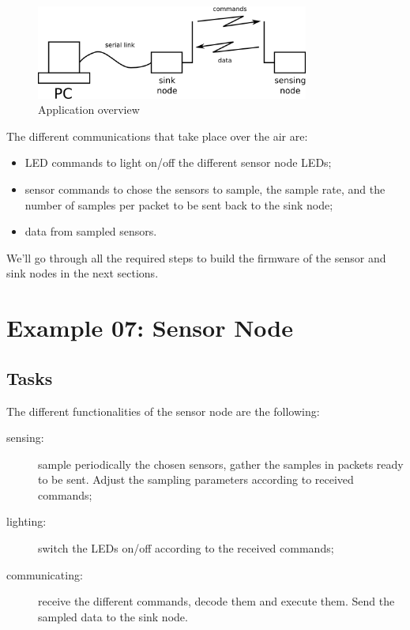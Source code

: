 \documentclass[11pt]{report}
\begin{document}
\begin{figure}[ht]
	\begin{center}
	\includegraphics[width=0.8\textwidth]{figures/archi.png}
	\end{center}
	\caption{Application overview}
	\label{fig:archi}
\end{figure}

The different communications that take place over the air are:
\begin{itemize}
	\item LED commands to light on/off the different sensor node LEDs;
	\item sensor commands to chose the sensors to sample, the sample rate, and the number of samples per packet to be sent back to the sink node;
	\item data from sampled sensors.
\end{itemize}

We'll go through all the required steps to build the firmware of the sensor and sink nodes in the next sections.

\section{Example 07: Sensor Node}

\subsection{Tasks}
The different functionalities of the sensor node are the following:
\begin{description}
	\item[sensing:] sample periodically the chosen sensors, gather the samples in packets ready to be sent. Adjust the sampling parameters according to received commands;
	\item[lighting:] switch the LEDs on/off according to the received commands;
	\item[communicating:] receive the different commands, decode them and execute them. Send the sampled data to the sink node.
\end{description}
\end{document}
